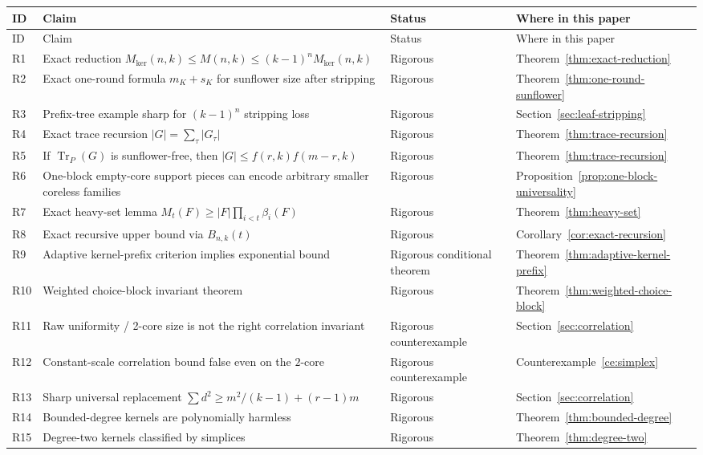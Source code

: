 \documentclass[11pt]{article}
\theoremstyle{definition}
\newcommand{\Tr}{\operatorname{Tr}}
\newcommand{\1}{\mathbf{1}}
\begin{document}
\renewcommand{\arraystretch}{1.15}
\begin{longtable}{p{}p{}p{}p{}}
\toprule
ID & Claim & Status & Where in this paper\\
\midrule
\endfirsthead
\toprule
ID & Claim & Status & Where in this paper\\
\midrule
\endhead
R1 & Exact reduction $M_{\ker}(n,k)\le M(n,k)\le (k-1)^n M_{\ker}(n,k)$ & Rigorous & Theorem~\ref{thm:exact-reduction}\\
R2 & Exact one-round formula $m_K+s_K$ for sunflower size after stripping & Rigorous & Theorem~\ref{thm:one-round-sunflower}\\
R3 & Prefix-tree example sharp for $(k-1)^n$ stripping loss & Rigorous & Section~\ref{sec:leaf-stripping}\\
R4 & Exact trace recursion $|G|=\sum_{\tau}|G_\tau|$ & Rigorous & Theorem~\ref{thm:trace-recursion}\\
R5 & If $\Tr_P(G)$ is sunflower-free, then $|G|\le f(r,k)f(m-r,k)$ & Rigorous & Theorem~\ref{thm:trace-recursion}\\
R6 & One-block empty-core support pieces can encode arbitrary smaller coreless families & Rigorous & Proposition~\ref{prop:one-block-universality}\\
R7 & Exact heavy-set lemma $M_t(F)\ge |F|\prod_{i<t}\beta_i(F)$ & Rigorous & Theorem~\ref{thm:heavy-set}\\
R8 & Exact recursive upper bound via $B_{n,k}(t)$ & Rigorous & Corollary~\ref{cor:exact-recursion}\\
R9 & Adaptive kernel-prefix criterion implies exponential bound & Rigorous conditional theorem & Theorem~\ref{thm:adaptive-kernel-prefix}\\
R10 & Weighted choice-block invariant theorem & Rigorous & Theorem~\ref{thm:weighted-choice-block}\\
R11 & Raw uniformity / 2-core size is not the right correlation invariant & Rigorous counterexample & Section~\ref{sec:correlation}\\
R12 & Constant-scale correlation bound false even on the $2$-core & Rigorous counterexample & Counterexample~\ref{ce:simplex}\\
R13 & Sharp universal replacement $\sum d^2\ge m^2/(k-1)+(r-1)m$ & Rigorous & Section~\ref{sec:correlation}\\
R14 & Bounded-degree kernels are polynomially harmless & Rigorous & Theorem~\ref{thm:bounded-degree}\\
R15 & Degree-two kernels classified by simplices & Rigorous & Theorem~\ref{thm:degree-two}\\

\end{longtable}
\end{document}
